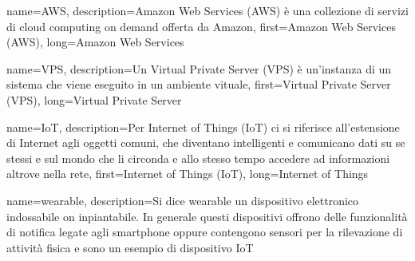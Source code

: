 {
    name={AWS},
    description={Amazon Web Services (AWS) è una collezione di servizi di cloud computing on demand offerta da Amazon},
    first={Amazon Web Services (AWS)},
    long={Amazon Web Services}
} 

{
    name={VPS},
    description={Un Virtual Private Server (VPS) è un'instanza di un sistema che viene eseguito in un ambiente vituale},
    first={Virtual Private Server (VPS)},
    long={Virtual Private Server}
}

{
    name={IoT},
    description={Per Internet of Things (IoT) ci si riferisce all'estensione di Internet agli oggetti comuni, che diventano intelligenti e comunicano dati su se stessi e sul mondo che li circonda e allo stesso tempo accedere ad informazioni altrove nella rete},
    first={Internet of Things (IoT)},
    long={Internet of Things}
}

{
    name={wearable},
    description={Si dice wearable un dispositivo elettronico indossabile on inpiantabile. In generale questi dispositivi offrono delle funzionalità di notifica legate agli smartphone oppure contengono sensori per la rilevazione di attività fisica e sono un esempio di dispositivo \gls{IoT}}
}
